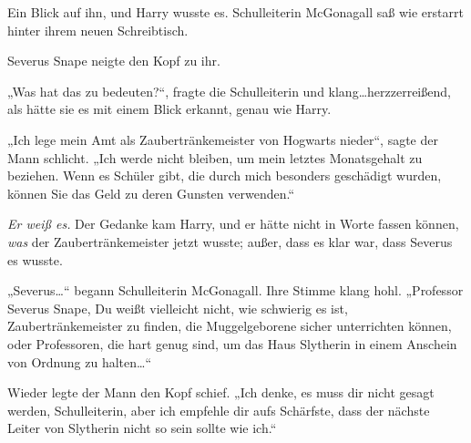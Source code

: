 Ein Blick auf ihn, und Harry wusste es. Schulleiterin McGonagall saß wie erstarrt hinter ihrem neuen Schreibtisch.

Severus Snape neigte den Kopf zu ihr.

„Was hat das zu bedeuten?“, fragte die Schulleiterin und klang…herzzerreißend, als hätte sie es mit einem Blick erkannt, genau wie Harry.

„Ich lege mein Amt als Zaubertränkemeister von Hogwarts nieder“, sagte der Mann schlicht. „Ich werde nicht bleiben, um mein letztes Monatsgehalt zu beziehen. Wenn es Schüler gibt, die durch mich besonders geschädigt wurden, können Sie das Geld zu deren Gunsten verwenden.“

\emph{Er weiß es.}
Der Gedanke kam Harry, und er hätte nicht in Worte fassen können, \emph{was} der Zaubertränkemeister jetzt wusste; außer, dass es klar war, dass Severus es wusste.

„Severus…“ begann Schulleiterin McGonagall. Ihre Stimme klang hohl. „Professor Severus Snape, Du weißt vielleicht nicht, wie schwierig es ist, Zaubertränkemeister zu finden, die Muggelgeborene sicher unterrichten können, oder Professoren, die hart genug sind, um das Haus Slytherin in einem Anschein von Ordnung zu halten…“

Wieder legte der Mann den Kopf schief.
„Ich denke, es muss dir nicht gesagt werden, Schulleiterin, aber ich empfehle dir aufs Schärfste, dass der nächste Leiter von Slytherin nicht so sein sollte wie ich.“

